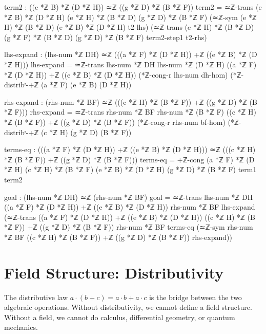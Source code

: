 \documentclass[11pt,a4paper]{book}
\begin{document}
\begin{code}
    term2 : ((e *ℤ B) *ℤ (D *ℤ H)) ≃ℤ ((g *ℤ D) *ℤ (B *ℤ F))
    term2 = ≃ℤ-trans {(e *ℤ B) *ℤ (D *ℤ H)} {(e *ℤ H) *ℤ (B *ℤ D)} {(g *ℤ D) *ℤ (B *ℤ F)}
              (≃ℤ-sym {(e *ℤ H) *ℤ (B *ℤ D)} {(e *ℤ B) *ℤ (D *ℤ H)} t2-lhs)
              (≃ℤ-trans {(e *ℤ H) *ℤ (B *ℤ D)} {(g *ℤ F) *ℤ (B *ℤ D)} {(g *ℤ D) *ℤ (B *ℤ F)} term2-step1 t2-rhs)

    lhs-expand : (lhs-num *ℤ DH) ≃ℤ (((a *ℤ F) *ℤ (D *ℤ H)) +ℤ ((e *ℤ B) *ℤ (D *ℤ H)))
    lhs-expand = ≃ℤ-trans {lhs-num *ℤ DH} {lhs-num *ℤ (D *ℤ H)} 
                  {((a *ℤ F) *ℤ (D *ℤ H)) +ℤ ((e *ℤ B) *ℤ (D *ℤ H))}
                  (*ℤ-cong-r lhs-num dh-hom)
                  (*ℤ-distribʳ-+ℤ (a *ℤ F) (e *ℤ B) (D *ℤ H))

    rhs-expand : (rhs-num *ℤ BF) ≃ℤ (((c *ℤ H) *ℤ (B *ℤ F)) +ℤ ((g *ℤ D) *ℤ (B *ℤ F)))
    rhs-expand = ≃ℤ-trans {rhs-num *ℤ BF} {rhs-num *ℤ (B *ℤ F)}
                  {((c *ℤ H) *ℤ (B *ℤ F)) +ℤ ((g *ℤ D) *ℤ (B *ℤ F))}
                  (*ℤ-cong-r rhs-num bf-hom)
                  (*ℤ-distribʳ-+ℤ (c *ℤ H) (g *ℤ D) (B *ℤ F))

    terms-eq : (((a *ℤ F) *ℤ (D *ℤ H)) +ℤ ((e *ℤ B) *ℤ (D *ℤ H))) ≃ℤ 
               (((c *ℤ H) *ℤ (B *ℤ F)) +ℤ ((g *ℤ D) *ℤ (B *ℤ F)))
    terms-eq = +ℤ-cong {(a *ℤ F) *ℤ (D *ℤ H)} {(c *ℤ H) *ℤ (B *ℤ F)}
                       {(e *ℤ B) *ℤ (D *ℤ H)} {(g *ℤ D) *ℤ (B *ℤ F)}
                       term1 term2

    goal : (lhs-num *ℤ DH) ≃ℤ (rhs-num *ℤ BF)
    goal = ≃ℤ-trans {lhs-num *ℤ DH} 
             {((a *ℤ F) *ℤ (D *ℤ H)) +ℤ ((e *ℤ B) *ℤ (D *ℤ H))}
             {rhs-num *ℤ BF}
             lhs-expand
             (≃ℤ-trans {((a *ℤ F) *ℤ (D *ℤ H)) +ℤ ((e *ℤ B) *ℤ (D *ℤ H))}
                       {((c *ℤ H) *ℤ (B *ℤ F)) +ℤ ((g *ℤ D) *ℤ (B *ℤ F))}
                       {rhs-num *ℤ BF}
                       terms-eq
                       (≃ℤ-sym {rhs-num *ℤ BF} 
                               {((c *ℤ H) *ℤ (B *ℤ F)) +ℤ ((g *ℤ D) *ℤ (B *ℤ F))}
                               rhs-expand))
\end{code}

\chapter{Field Structure: Distributivity}
\label{chap:distributivity}

The distributive law $a \cdot (b + c) = a \cdot b + a \cdot c$ is the bridge between the two algebraic operations. Without distributivity, we cannot define a field structure. Without a field, we cannot do calculus, differential geometry, or quantum mechanics.
\end{document}

